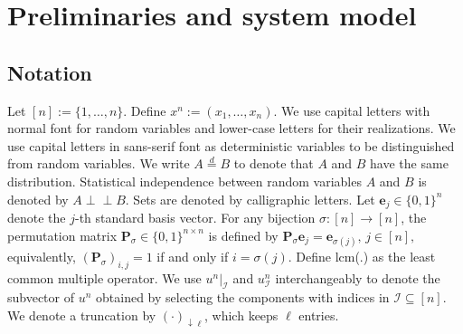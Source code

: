 \documentclass[onecolumn]{IEEEtran} %
\newcommand{\bP}{\mathbf P}
\newcommand{\1}{\mathbbm{1}}
\theoremstyle{boldremark}
\newcommand{\be}{\mathbf e}
\newcommand{\pperp}{\mathrel{\perp\!\!\!\perp}}
\begin{document}








\section{Preliminaries and system model}
\subsection{Notation}
Let $[n]:=\{1,\dots,n\}$. Define $x^n:=(x_1,\dots,x_n)$.
We use capital letters with normal font for random variables and lower-case
letters for their realizations. We use capital letters in sans-serif font as deterministic variables to be distinguished from random variables. We write $A\overset{d}{=}B$ to denote that $A$ and $B$ have the same distribution. Statistical independence between random variables $A$ and $B$ is denoted by $A\pperp B$. Sets are denoted by calligraphic letters. Let $\be_j\in\{0,1\}^n$ denote the $j$-th standard basis vector.
For any bijection $\sigma:[n]\to[n]$, the permutation matrix
$\bP_{\sigma}\in\{0,1\}^{n\times n}$ is defined by
$\bP_{\sigma}\be_j=\be_{\sigma(j)},\, j\in[n],$ equivalently, $(\bP_{\sigma})_{i,j}=1$ if and only if $i=\sigma(j)$. Define lcm(.) as the least common multiple operator. We use $u^n|_{\mathcal I}$ and $u^n_{\mathcal I}$ interchangeably to denote the subvector of $u^n$ obtained by selecting the components with indices in $\mathcal I\subseteq[n]$. We denote a truncation by $(\cdot)_{\downarrow \ell}$, which keeps $\ell$ entries.
\end{document}
